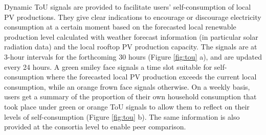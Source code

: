 Dynamic ToU signals are provided to facilitate users' self-consumption of local PV productions.
They give clear indications to encourage or discourage electricity consumption at a certain moment based on the forecasted local renewable production level calculated with weather forecast information (in particular solar radiation data) and the local rooftop PV production capacity. 
The signals are at 3-hour intervals for the forthcoming 30 hours (Figure \ref{fig:tou} a), and are updated every 24 hours. A green smiley face signals a time slot suitable for self-consumption where the forecasted local PV production exceeds the current local consumption, while an orange frown face signals otherwise.  
% 
On a weekly basis, users get a summary of the proportion of their own household consumption that took place under green or orange ToU signals to allow them to reflect on their levels of self-consumption (Figure \ref{fig:tou} b). The same information is also provided at the consortia level to enable peer comparison. 



